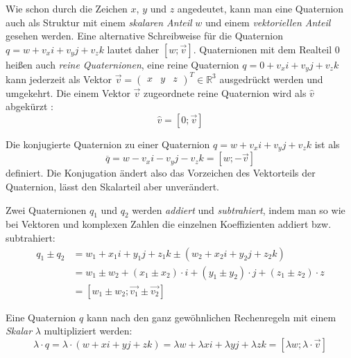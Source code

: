 Wie schon durch die Zeichen $x$, $y$ und $z$ angedeutet, kann man eine Quaternion auch als Struktur mit einem \emph{skalaren Anteil} $w$ und einem \emph{vektoriellen Anteil}  gesehen werden. Eine alternative Schreibweise für die Quaternion $q = w + v_{x}i + v_{y}j + v_{z}k$ lautet daher $\left[w; \vec v \right]$. Quaternionen mit dem Realteil $0$ heißen auch \emph{reine Quaternionen}, eine reine Quaternion $q = 0 + v_{x}i + v_{y}j + v_{z}k$ kann jederzeit als Vektor $ \vec v = \begin{pmatrix} x & y & z \end{pmatrix}^T \in \mathbb R^3$ ausgedrückt werden und umgekehrt. Die einem Vektor $\vec v$ zugeordnete reine Quaternion wird als $\hat{v}$ abgekürzt :
\begin{equation}
 \hat{v} = \left[ 0; \vec v \right]
\end{equation} 

Die konjugierte Quaternion zu einer Quaternion $q = w + v_{x}i + v_{y}j + v_{z}k$ ist als
\begin{equation}
 \overline{q} = w - v_{x}i - v_{y}j - v_{z}k = \left[ w; -\vec v \right]
\end{equation}
definiert. Die Konjugation ändert also das Vorzeichen des Vektorteils der Quaternion, lässt den Skalarteil aber unverändert.

Zwei Quaternionen $q_1$ und $q_2$ werden \emph{addiert} und \emph{subtrahiert}, indem man so wie bei Vektoren und komplexen Zahlen die einzelnen Koeffizienten addiert bzw. subtrahiert:
\begin{equation}
\begin{split}
 q_1 \pm q_2 &= w_1 + x_{1}i + y_{1}j + z_{1}k \pm \left( w_2 + x_{2}i + y_{2}j + z_{2}k \right) \\
 &= w_1 \pm w_2 + \left( x_1 \pm x_2 \right) \cdot i + \left( y_1 \pm y_2 \right) \cdot j + \left( z_1 \pm z_2 \right) \cdot z \\
 &= \left[ w_1 \pm w_2; \vec{v_1} \pm \vec{v_2} \right]
\end{split}
\end{equation}

Eine Quaternion $q$ kann nach den ganz gewöhnlichen Rechenregeln mit einem \emph{Skalar} $\lambda$ multipliziert werden:
\begin{equation}
 \lambda \cdot q = \lambda \cdot (w + xi + yj + zk) = \lambda w + \lambda xi + \lambda yj + \lambda zk = \left[ \lambda w; \lambda \cdot \vec v \right]
\end{equation}

